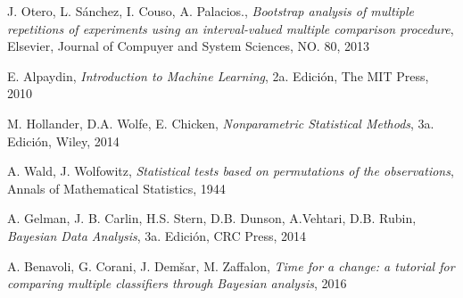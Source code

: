 \begin{thebibliography}{99}
	J. Otero, L. Sánchez, I. Couso, A. Palacios.,
	\emph{Bootstrap analysis of multiple repetitions of experiments using an interval-valued multiple comparison procedure},
	Elsevier, Journal of Compuyer and System Sciences,
	NO. 80,
	2013

	E. Alpaydin,
	\emph{Introduction to Machine Learning},
	2a. Edición, 
	The MIT Press,
	2010

	M. Hollander, D.A. Wolfe, E. Chicken,
	\emph{Nonparametric Statistical Methods},
	3a. Edición,
	Wiley,
	2014

	A. Wald, J. Wolfowitz,
	\emph{Statistical tests based on permutations of the observations},
	Annals of Mathematical Statistics,
	1944
	
	A. Gelman, J. B. Carlin, H.S. Stern, D.B. Dunson, A.Vehtari, D.B. Rubin,
	\emph{Bayesian Data Analysis},
	3a. Edición,
	CRC Press,
	2014
	
	
	A. Benavoli, G. Corani, J. Dem\v{s}ar, M. Zaffalon,
	\emph{Time for a change: a tutorial for comparing multiple classifiers through Bayesian analysis},
	2016
	



	
\end{thebibliography}